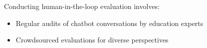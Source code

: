 \documentclass[14pt,a4paper]{article}
\begin{document}
\begin{multicols}{2}
Conducting human-in-the-loop evaluation \textit{\parencite[pp. 30-60]{Vaughan2024}} involves:
\begin{itemize}
    \item Regular audits of chatbot conversations by education experts
    \item Crowdsourced evaluations for diverse perspectives
\end{itemize}


%






\end{multicols}
\end{document}
